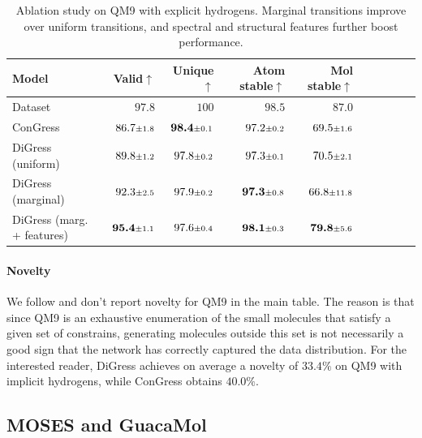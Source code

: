 \documentclass{article} %
\theoremstyle{plain}
\theoremstyle{definition}
\theoremstyle{remark}
\begin{document}
\begin{table}[t]
    \centering
    \caption{Ablation study on QM9 with explicit hydrogens. Marginal transitions improve over uniform transitions, and spectral and structural features further boost performance.}     \label{tab:qm9withH}
    \begin{tabular}{l r r r r r r r r r} \toprule
Model     &  Valid$\uparrow$\hspace{0.3cm} & Unique$\uparrow$\hspace{0.2cm} & Atom stable$\uparrow$ & Mol stable$\uparrow$ \\ \midrule
Dataset  &  $97.8$\hspace{0.62cm} & $100$\hspace{0.62cm} & $98.5$\hspace{0.62cm} & $87.0$\hspace{0.65cm} \\ \midrule
ConGress &$86.7{\scriptstyle \pm {1.8}}$  & $\bm{98.4} {\scriptstyle \pm {0.1}}$ & $97.2 {\scriptstyle \pm {0.2}}$ & $69.5 {\scriptstyle \pm {1.6}}$ \hspace{0.1cm}\\
DiGress (uniform)&  $89.8 {\scriptstyle \pm {1.2}}$ & $97.8 {\scriptstyle \pm {0.2}}$ & $97.3{\scriptstyle \pm {0.1}}$ & $70.5 {\scriptstyle \pm {2.1}}$\hspace{0.1cm} \\
DiGress (marginal)  & $92.3 {\scriptstyle \pm {2.5}}$ & $97.9 {\scriptstyle \pm {0.2}}$ & $\bm{97.3} {\scriptstyle \pm {0.8}} $ & $66.8 {\scriptstyle \pm {11.8}}$\\
DiGress (marg. + features) & $\bm{95.4} {\scriptstyle \pm {1.1}}$ & $97.6 {\scriptstyle \pm {0.4}}$ & $\bm{98.1}{\scriptstyle \pm {0.3}}$ & $\bm{79.8} {\scriptstyle \pm {5.6}}$ \\  \bottomrule
    \end{tabular}
\end{table}

\paragraph{Novelty}
We follow \citet{vignac2021top} and don't report novelty for QM9 in the main table. The reason is that since QM9 is an exhaustive enumeration of the small molecules that satisfy a given set of constrains, generating molecules outside this set is not necessarily a good sign that the network has correctly captured the data distribution. For the interested reader, DiGress achieves on average a novelty of $33.4\%$ on QM9 with implicit hydrogens, while ConGress obtains $40.0\%$.

\subsection{MOSES and GuacaMol}
\end{document}

